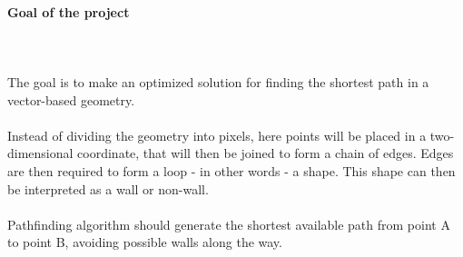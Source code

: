 \documentclass[a4paper,12pt]{article}
\begin{document}
\paragraph{Goal of the project} \hspace{0pt}
\\
\\
The goal is to make an optimized solution for finding the shortest path in a vector-based geometry.
\\
\\
Instead of dividing the geometry into pixels, here points will be placed in a two-dimensional
coordinate, that will then be joined to form a chain of edges. Edges are then required to form
a loop - in other words - a shape. This shape can then be interpreted as a wall or non-wall.
\\
\\
Pathfinding algorithm should generate the shortest available path from point A to point B,
avoiding possible walls along the way.
\\
\\
\end{document}
